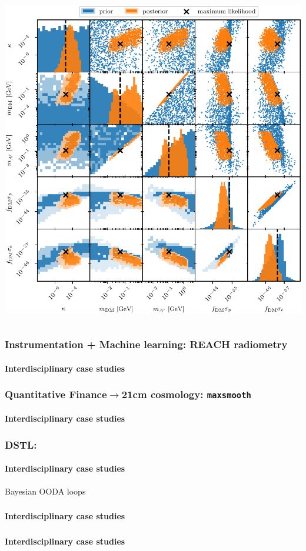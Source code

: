 \documentclass[aspectratio=169]{beamer}
\begin{document}
\begin{frame}
\begin{columns}
        \includegraphics[width=\textwidth]{figures/Bayes_SubGeVDM_fermion_RDprior_allDM_asym_observables.pdf}
    \end{columns}
\end{frame}

\begin{frame}
    \frametitle{Instrumentation + Machine learning: REACH radiometry}
    \framesubtitle{Interdisciplinary case studies}

\end{frame}

\begin{frame}
    \frametitle{Quantitative Finance$\to$21cm cosmology: \texttt{maxsmooth}}
    \framesubtitle{Interdisciplinary case studies}
\end{frame}

\begin{frame}
    \frametitle{DSTL: }
    \framesubtitle{Interdisciplinary case studies}
    Bayesian OODA loops
\end{frame}


\begin{frame}
    \frametitle{}
    \framesubtitle{Interdisciplinary case studies}
\end{frame}

\begin{frame}
    \frametitle{}
    \framesubtitle{Interdisciplinary case studies}
\end{frame}
\end{document}

